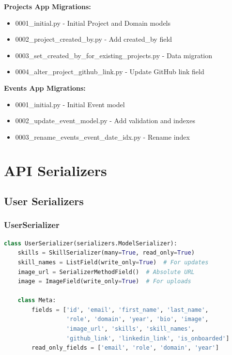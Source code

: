 \documentclass[11pt,a4paper]{article}
\begin{document}
\textbf{Projects App Migrations:}
\begin{itemize}[leftmargin=*]
    \item 0001\_initial.py - Initial Project and Domain models
    \item 0002\_project\_created\_by.py - Add created\_by field
    \item 0003\_set\_created\_by\_for\_existing\_projects.py - Data migration
    \item 0004\_alter\_project\_github\_link.py - Update GitHub link field
\end{itemize}

\textbf{Events App Migrations:}
\begin{itemize}[leftmargin=*]
    \item 0001\_initial.py - Initial Event model
    \item 0002\_update\_event\_model.py - Add validation and indexes
    \item 0003\_rename\_events\_event\_date\_idx.py - Rename index
\end{itemize}

\section{API Serializers}

\subsection{User Serializers}

\subsubsection{UserSerializer}
\begin{lstlisting}[language=Python]
class UserSerializer(serializers.ModelSerializer):
    skills = SkillSerializer(many=True, read_only=True)
    skill_names = ListField(write_only=True)  # For updates
    image_url = SerializerMethodField()  # Absolute URL
    image = ImageField(write_only=True)  # For uploads
    
    class Meta:
        fields = ['id', 'email', 'first_name', 'last_name', 
                  'role', 'domain', 'year', 'bio', 'image', 
                  'image_url', 'skills', 'skill_names', 
                  'github_link', 'linkedin_link', 'is_onboarded']
        read_only_fields = ['email', 'role', 'domain', 'year']
\end{lstlisting}
\end{document}
